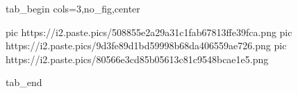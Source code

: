  
 
 
 
 


\ifcmt
  tab_begin cols=3,no_fig,center

     pic https://i2.paste.pics/508855e2a29a31c1fab67813ffe39fca.png
		 pic https://i2.paste.pics/9d3fe89d1bd59998b68da406559ae726.png
		 pic https://i2.paste.pics/80566e3cd85b05613c81c9548bcae1e5.png

  tab_end
\fi
